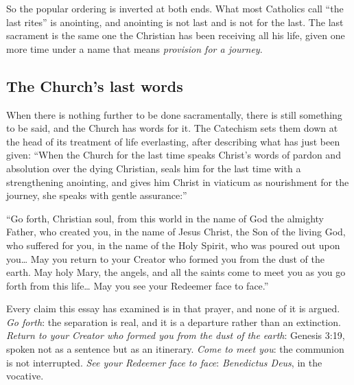 So the popular ordering is inverted at both ends. What most Catholics call ``the last rites'' is anointing, and anointing is not last and is not for the last. The last sacrament is the same one the Christian has been receiving all his life, given one more time under a name that means \emph{provision for a journey}.

\subsection{The Church's last words}

When there is nothing further to be done sacramentally, there is still something to be said, and the Church has words for it. The Catechism sets them down at the head of its treatment of life everlasting, after describing what has just been given: ``When the Church for the last time speaks Christ's words of pardon and absolution over the dying Christian, seals him for the last time with a strengthening anointing, and gives him Christ in viaticum as nourishment for the journey, she speaks with gentle assurance:''

``Go forth, Christian soul, from this world in the name of God the almighty Father, who created you, in the name of Jesus Christ, the Son of the living God, who suffered for you, in the name of the Holy Spirit, who was poured out upon you\ldots{} May you return to your Creator who formed you from the dust of the earth. May holy Mary, the angels, and all the saints come to meet you as you go forth from this life\ldots{} May you see your Redeemer face to face.''

Every claim this essay has examined is in that prayer, and none of it is argued. \emph{Go forth}: the separation is real, and it is a departure rather than an extinction. \emph{Return to your Creator who formed you from the dust of the earth}: Genesis 3:19, spoken not as a sentence but as an itinerary. \emph{Come to meet you}: the communion is not interrupted. \emph{See your Redeemer face to face}: \emph{Benedictus Deus}, in the vocative.

